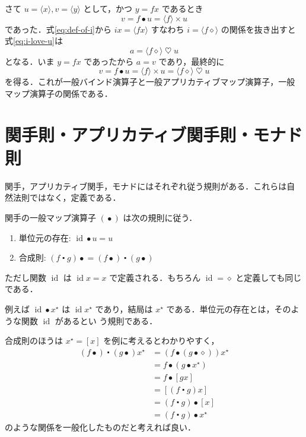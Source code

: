 \documentclass[a5paper,twoside,fleqn]{jsbook}
\newcommand{\mAnonParam}{\diamond}
\DeclareMathOperator{\mId}{id}
\DeclareMathOperator{\mAppMap}{\times}
\DeclareMathOperator{\mBind}{\heartsuit}
\DeclareMathOperator{\mComp}{\centerdot}
\DeclareMathOperator{\mMap}{\bullet}
\newcommand{\mListWith}[1]{\left[#1\right]}
\newcommand{\mPureWith}[1]{\langle#1\rangle}
\newcommand{\mList}[1]{{#1}^\mathrm{\star}}
\begin{document}
さて $u=\mPureWith{x},v=\mPureWith{y}$ として，かつ $y=fx$ であるとき
\begin{equation}
v=f\mMap u=\mPureWith{f}\mAppMap u
\end{equation}
であった．式\eqref{eq:def-of-i}から $ix=\mPureWith{fx}$ すなわち
$i=\mPureWith{f\mAnonParam}$ の関係を抜き出すと式\eqref{eq:i-love-u}は
\begin{equation}
a=\mPureWith{f\mAnonParam}\mBind u
\end{equation}
となる．いま $y=fx$ であったから $a=v$ であり，最終的に
\begin{equation}
v=f\mMap u=\mPureWith{f}\mAppMap u=\mPureWith{f\mAnonParam}\mBind u
\end{equation}
を得る．これが一般バインド演算子と一般アプリカティブマップ演算子，一般
マップ演算子の関係である．


\section{関手則・アプリカティブ関手則・モナド則}

関手，アプリカティブ関手，モナドにはそれぞれ従う規則がある．これらは自
然法則ではなく，定義である．

関手の一般マップ演算子 $(\mMap)$ は次の規則に従う．
\begin{enumerate}
\item 単位元の存在: $\mId\mMap u=u$
\item 合成則: $(f\mComp g)\mMap=(f\mMap)\mComp{}(g\mMap)$%
\end{enumerate}
ただし関数 $\mId$ は $\mId x=x$ で定義される．もちろん
$\mId=\mAnonParam$ と定義しても同じである．

例えば $\mId\mMap\mList{x}$ は $\mId\mList{x}$ であり，結局は
$\mList{x}$ である．単位元の存在とは，そのような関数 $\mId$ があるとい
う規則である．

合成則のほうは $\mList{x}=\mListWith{x}$ を例に考えるとわかりやすく，
\begin{align}
(f\mMap)\mComp(g\mMap)\mList{x}
&=(f\mMap{}(g\mMap\mAnonParam))\mList{x}\\
&=f\mMap{}(g\mMap\mList{x})\\
&=f\mMap{}\mListWith{gx}\\
&=\mListWith{(f\mComp g)x}\\
&=(f\mComp g)\mMap{}\mListWith{x}\\
&=(f\mComp g)\mMap\mList{x}
\end{align}
のような関係を一般化したものだと考えれば良い．
\end{document}

